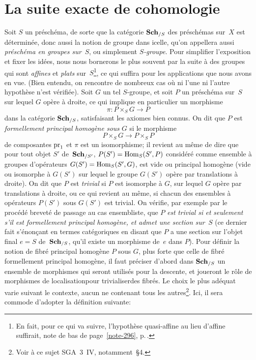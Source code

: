 \section{La suite exacte de cohomologie}
\label{XI.4}

Soit $S$ un pr\'esch\'ema, de sorte que la cat\'egorie
$\mathbf{Sch}_{/S}$ des pr\'esch\'emas sur~$X$ est d\'etermin\'ee,
donc aussi la notion de groupe dans icelle, qu'on appellera aussi
\emph{préschéma en groupes sur~$S$}, ou simplement
\emph{$S$-groupe}. Pour simplifier l'exposition et fixer les
id\'ees, nous nous bornerons le plus souvent par la suite \`a des
groupes qui sont \emph{affines} et \emph{plats} sur~$S$\footnote{En
fait, pour ce qui va suivre, l'hypoth\`ese quasi-affine au lieu
d'affine suffirait, \cf note de bas de page~\eqref{note-296}, p.\,\pageref{note-296}.}, ce qui
suffira pour les applications que nous avons en vue. (Bien entendu, on
rencontre de nombreux cas o\`u ni l'une ni l'autre hypoth\`ese
n'est v\'erifi\'ee). Soit
$G$ un tel $S$-groupe, et soit $P$ un pr\'esch\'ema sur~$S$ sur
lequel $G$ op\`ere \`a droite, ce qui implique en particulier un
morphisme
$$
\pi:P\times_SG\to P
$$
dans la cat\'egorie $\mathbf{Sch}_{/S}$, satisfaisant les axiomes bien
connus. On dit que $P$ est \emph{formellement principal homogène
sous} $G$ si le morphisme
$$
P\times_S G\to P\times_S P
$$
de composantes $\mathrm{pr}_1$ et $\pi$ est un isomorphisme; il revient au
m\^eme de dire que pour tout objet $S'$ de~$\mathbf{Sch}_{/S'}$,
$P(S')=\operatorname{Hom}_S(S',P)$ consid\'er\'e comme ensemble \`a groupes
d'op\'erateurs $G(S')=\operatorname{Hom}_S(S',G)$, est vide ou principal
homog\`ene (\ie vide ou isomorphe \`a $G(S')$ sur lequel le
groupe $G(S')$ op\`ere par translations \`a droite). On dit que
$P$ est \emph{trivial} si $P$ est isomorphe \`a $G$, sur lequel $G$
op\`ere par translations \`a droite, ou ce qui revient au
m\^eme, si chacun des ensembles \`a op\'erateurs $P(S')$ sous
$G(S')$ est trivial. On v\'erifie, par exemple par le
proc\'ed\'e brevet\'e de passage au cas ensembliste, que $P$
\emph{est trivial si et seulement
s'il
est formellement principal homogène, et admet une section sur~$S$}
(ce dernier fait s'\'enon\c cant en termes cat\'egoriques en
disant que $P$ a une section sur l'objet final $e=S$ de~$\mathbf{Sch}_{/S}$,
\ie qu'il existe un morphisme de~$e$ dans $P$). Pour d\'efinir la
notion de fibr\'e principal homog\`ene $P$ sous $G$, plus forte
que celle de fibr\'e formellement principal homog\`ene, il faut
pr\'eciser d'abord dans $\mathbf{Sch}_{/S}$ un ensemble de morphismes qui
seront utilis\'es pour la \og descente\fg, et joueront le r\^ole de
\og morphismes de localisation\fg pour \og trivialiser\fg des fibr\'es. Le
choix le plus ad\'equat varie suivant le contexte, aucun ne
contenant tous les autres\footnote{\label{note-293}Voir \`a ce sujet
SGA~3~IV, notamment~\S 4.}. Ici, il sera commode d'adopter la
d\'efinition suivante:

